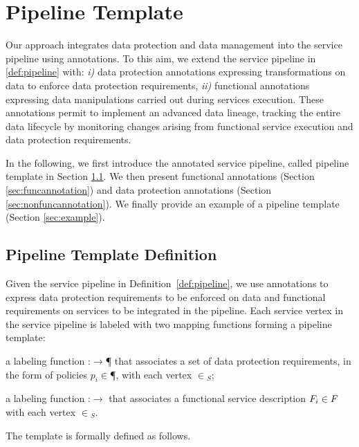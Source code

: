 \section{Pipeline Template}
Our approach integrates data protection and data management into the service pipeline using annotations.
To this aim, we extend the service pipeline in \cref{def:pipeline} with: \emph{i)} data protection annotations expressing transformations on data to enforce data protection requirements, \emph{ii)} functional annotations expressing data manipulations carried out during services execution.
These annotations permit to implement an advanced data lineage, tracking the entire data lifecycle by monitoring changes arising from functional service execution and data protection requirements.

In the following, we first introduce the annotated service pipeline, called pipeline template in Section \ref{sec:templatedefinition}. We then present functional annotations (Section \ref{sec:funcannotation}) and data protection annotations (Section \ref{sec:nonfuncannotation}). We finally provide an example of a pipeline template (Section \ref{sec:example}).


\subsection{Pipeline Template Definition}\label{sec:templatedefinition}
Given the service pipeline in Definition~\ref{def:pipeline}, we use annotations to express data protection requirements to be enforced on data and functional requirements on services to be integrated in the pipeline. Each service vertex in the service pipeline is labeled with two mapping functions forming a pipeline template:
\begin{enumerate*}[label=\roman*)]
  \item a labeling function \myLambda:\V$\rightarrow$\P{} that associates a set of data protection requirements, in the form of policies $p_i\in$\P{}, with each vertex $\in$\V$_S$;
  \item a labeling function \myGamma:\V$\rightarrow$\F{} that associates a functional service description $F_i\in F_{}$ with each vertex $\in$\V$_S$.
\end{enumerate*}

The template is formally defined as follows.

